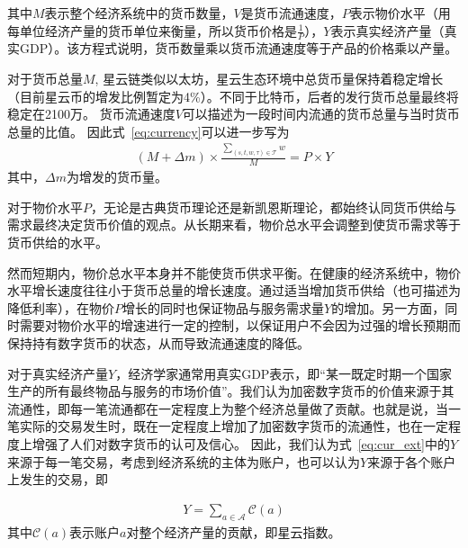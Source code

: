 其中$M$表示整个经济系统中的货币数量，$V$是货币流通速度，$P$表示物价水平（用每单位经济产量的货币单位来衡量，所以货币价格是$\frac{1}{P}$），$Y$表示真实经济产量（真实GDP）。该方程式说明，货币数量乘以货币流通速度等于产品的价格乘以产量。


对于货币总量$M$, 星云链类似以太坊，星云生态环境中总货币量保持着稳定增长（目前星云币的增发比例暂定为4\%）。不同于比特币，后者的发行货币总量最终将稳定在2100万。
货币流通速度$V$可以描述为一段时间内流通的货币总量与当时货币总量的比值。
因此式~\ref{eq:currency}可以进一步写为
\begin{align}
(M + \Delta{m}) \times \frac{\sum_{(s, t, w, \tau)\in \mathcal{T}}{w}}{M} = P \times Y
\label{eq:cur_ext}
\end{align}
\noindent 其中，$\Delta{m}$为增发的货币量。



对于物价水平$P$，无论是古典货币理论还是新凯恩斯理论，都始终认同货币供给与需求最终决定货币价值的观点。从长期来看，物价总水平会调整到使货币需求等于货币供给的水平。

然而短期内，物价总水平本身并不能使货币供求平衡。在健康的经济系统中，物价水平增长速度往往小于货币总量的增长速度。通过适当增加货币供给（也可描述为降低利率），在物价$P$增长的同时也保证物品与服务需求量$Y$的增加。另一方面，同时需要对物价水平的增速进行一定的控制，以保证用户不会因为过强的增长预期而保持持有数字货币的状态，从而导致流通速度的降低。




对于真实经济产量$Y$，经济学家通常用真实GDP表示，即“某一既定时期一个国家生产的所有最终物品与服务的市场价值”。我们认为加密数字货币的价值来源于其流通性，即每一笔流通都在一定程度上为整个经济总量做了贡献。也就是说，当一笔实际的交易发生时，既在一定程度上增加了加密数字货币的流通性，也在一定程度上增强了人们对数字货币的认可及信心。
因此，我们认为式~\ref{eq:cur_ext}中的$Y$来源于每一笔交易，考虑到经济系统的主体为账户，也可以认为$Y$来源于各个账户上发生的交易，即

\begin{align}
Y=\sum_{a\in \mathcal{A}} \mathcal{C}(a)
\end{align}
\noindent 其中$\mathcal{C}(a)$表示账户$a$对整个经济产量的贡献，即星云指数。

